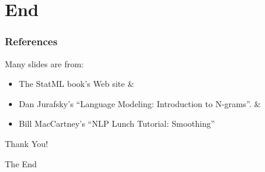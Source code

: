 \documentclass{beamer}
\begin{document}
\section{End}
\begin{frame} \frametitle{References}
Many slides are from:
\begin{itemize}
\item The \alert{StatML} book's Web site \&
\item \alert{Dan Jurafsky}'s
``Language Modeling: Introduction to N-grams''. \&
\item \alert{Bill MacCartney}'s ``NLP Lunch Tutorial: Smoothing''
\end{itemize}
\begin{center}
\Huge\alert {Thank You!}
\end{center}

\end{frame}
\begin{frame}
\Huge{\centerline{The End}}
\end{frame}

\end{document}
